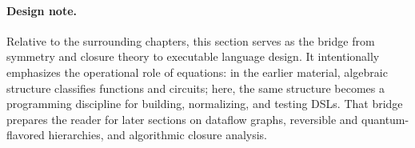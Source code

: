 \paragraph{Design note.} Relative to the surrounding chapters, this section serves as the bridge from symmetry and closure theory to executable language design. It intentionally emphasizes the operational role of equations: in the earlier material, algebraic structure classifies functions and circuits; here, the same structure becomes a programming discipline for building, normalizing, and testing DSLs. That bridge prepares the reader for later sections on dataflow graphs, reversible and quantum-flavored hierarchies, and algorithmic closure analysis.
